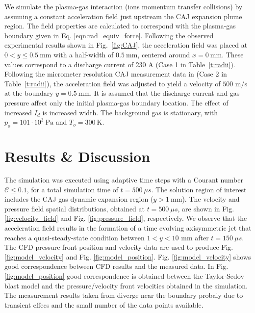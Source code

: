 \documentclass[a4paper]{iacas}%
\begin{document}
We simulate the plasma-gas interaction (ions momentum transfer collisions) by assuming a constant acceleration field just upstream the CAJ expansion plume region. The field properties are calculated to correspond with the plasma-gas boundary given in Eq. \eqref{eqn:rad_equiv_force}. Following the observed experimental results shown in Fig.~\ref{fig:CAJ}, the acceleration field was placed at $0  < y \leq 0.5~ \mathrm{mm} $ with a half-width of $0.5~\mathrm{mm}$, centered around $x=0~\mathrm{mm}$. These values correspond to a discharge current of 230 A (Case 1 in Table~\ref{t:radii}).
Following the micrometer resolution CAJ measurement data in \cite{KRClose} (Case 2 in Table~\ref{t:radii}), the acceleration field was adjusted to yield a velocity of $500$ m/s at the boundary $y = 0.5~\mathrm{mm}$. It is assumed that the discharge current and gas pressure affect only the initial plasma-gas boundary location. The effect of increased $I_d$ is increased width. The background gas is stationary, with $p_o = 101\cdot 10^3~\mathrm{Pa}$ and $T_o = 300~\mathrm{K}$.

\section{Results \& Discussion}

The simulation was executed using adaptive time steps with a Courant number $\mathcal{C} \leq 0.1$, for a total simulation time of $t = 500~\mu s$. The solution region of interest includes the CAJ gas dynamic expansion region ($ y > 1~\mathrm{mm} $). The velocity and pressure field spatial distributions, obtained at $ t = 500~\mu s $, are shown in Fig. \ref{fig:velocity_field} and Fig. \ref{fig:pressure_field}, respectively. We observe that the acceleration field results in the formation of a time evolving axisymmetric jet that reaches a quasi-steady-state condition between $1 < y < 10$ mm after $t = 150~\mu s$.
The CFD pressure front position and velocity data are used to produce Fig. \ref{fig:model_velocity} and Fig. \ref{fig:model_position}. Fig. \ref{fig:model_velocity} shows good correspondence between CFD results and the measured data. In Fig. \ref{fig:model_position} good correspondence is obtained between the Taylor-Sedov blast model and the pressure/velocity front velocities obtained in the simulation. The measurement results taken from \cite{KR} diverge near the boundary probaly due to transient effecs and the small number of the data points available.
\end{document}
